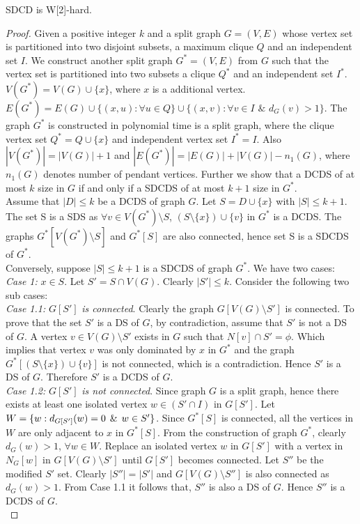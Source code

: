 \begin{theorem}
SDCD is W[2]-hard.
\end{theorem}
\begin{proof}
Given a positive integer $k$ and a split graph $G=(V,E)$ whose vertex set is partitioned into two disjoint subsets, a maximum clique $Q$ and an independent set $I$. We construct another split graph $G^*=(V,E)$ from $G$ such that the vertex set is partitioned into two subsets a clique $Q^*$ and an independent set $I^*$. $V(G^*) = V(G) \cup \lbrace x \rbrace $, where $x$ is a additional vertex. $E(G^*) = E(G) \cup \lbrace (x, u) : \forall u \in Q\rbrace \cup \lbrace (x, v) : \forall v \in I$ $\&$ $d_G(v) > 1\rbrace $. The graph $G^*$ is constructed in polynomial time is a split graph, where the clique vertex set $Q^*=Q\cup \lbrace x \rbrace$ and independent vertex set $I^*=I$. Also $|V(G^*)| = |V(G)|+1$ and $|E(G^*)|=|E(G)|+|V(G)|-n_1(G)$, where $n_1(G)$ denotes number of pendant vertices. Further we show that a DCDS of at most $k$ size in $G$ if and only if a SDCDS of at most $k + 1$ size  in $G^*$. \\
\noindent Assume that $|D| \leq k$ be a DCDS of graph $G$. Let $S=D \cup \lbrace x \rbrace$ with $|S|\leq k+1$. The set S is a SDS as $\forall v \in V(G^*)\setminus S$, $(S\setminus \lbrace x \rbrace) \cup \lbrace v \rbrace$ in $G^*$ is a DCDS. The graphs $G^*[V(G^*)\setminus S]$ and $G^*[S]$ are also connected, hence set S is a SDCDS of $G^*$.\\
Conversely, suppose $|S| \leq k+1$ is a SDCDS of graph $G^*$. We have two cases:\\
\textit{Case 1:} $x \in S$. Let $S'=S \cap V(G)$. Clearly $|S'| \leq k$. Consider the following two sub cases:\\
\textit{Case 1.1:} $G[ S']$ \textit{is connected}. Clearly the graph $G[V(G) \setminus S']$ is connected. To prove that the set $S'$ is a DS of $G$, by contradiction, assume that $S'$ is not a DS of $G$. A vertex $v \in V(G)\setminus S'$ exists in $G$ such that $N[v] \cap S' = \phi$. Which implies that vertex $v$ was only dominated by $x$ in $G^*$ and the graph $G^*[ (S \setminus \lbrace x \rbrace) \cup \lbrace v \rbrace]$ is not connected, which is a contradiction. Hence $S'$ is a DS of $G$. Therefore $S'$ is a DCDS of $G$.\\
\textit{Case 1.2:} $G[ S']$ \textit{is not connected}. Since graph $G$ is a split graph, hence there exists at least one isolated vertex $w \in (S' \cap I)$ in $G[S']$. Let $W = \lbrace w:d_{G[ S']}(w) = 0 \hspace{1ex} \& \hspace{1ex} w \in S' \rbrace $. Since $G^*[ S ]$ is connected, all the vertices in $W$ are only adjacent to $x$ in $G^*[ S]$. From the construction of graph $G^*$, clearly $d_G(w) > 1 $, $\forall w \in W$. Replace an isolated vertex $w$ in $G[ S']$ with a vertex in $N_G[w]$ in $G[ V(G) \setminus S' ]$ until $G[S']$ becomes connected. Let $S''$ be the modified $S'$ set. Clearly $|S''| = |S'|$ and $G[ V(G)\setminus S'']$ is also connected as $d_G(w) > 1$. From Case 1.1 it follows that, $S''$ is also a DS of $G$. Hence $S''$ is a DCDS of $G$.\\

\end{proof}
